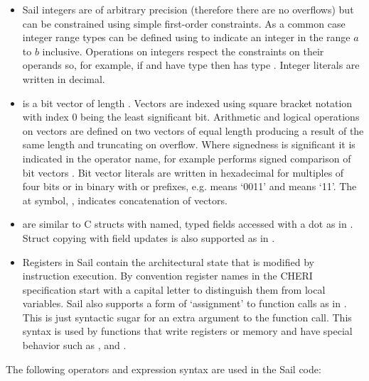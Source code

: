 \label{sailMIPSzbits}
\label{sailRISCVzbits}
\begin{itemize}
\item {} Sail integers are of arbitrary precision (therefore there are no overflows) but can be constrained using simple first-order constraints. As a common case integer range types can be defined using  to indicate an integer in the range $a$ to $b$ inclusive. Operations on integers respect the constraints on their operands so, for example, if  and  have type  then  has type . Integer literals are written in decimal.
\item {} \label{zbits} is a bit vector of length . Vectors are indexed using square bracket notation with index 0 being the least significant bit. Arithmetic and logical operations on vectors are defined on two vectors of equal length producing a result of the same length and truncating on overflow. Where signedness is significant it is indicated in the operator name, for example  performs signed comparison of bit vectors . Bit vector literals are written in hexadecimal for multiples of four bits or in binary with  or  prefixes, e.g.  means `0011' and  means `11'. The at symbol, , indicates concatenation of vectors.
\item {} are similar to C structs with named, typed fields accessed with a dot as in . Struct copying with field updates is also supported as in .
\item Registers in Sail contain the architectural state that is modified by instruction execution. By convention register names in the CHERI specification start with a capital letter to distinguish them from local variables. Sail also supports a form of `assignment' to function calls as in . This is just syntactic sugar for an extra argument to the function call. This syntax is used by functions that write registers or memory and have special behavior such as ,  and .
\end{itemize}

The following operators and expression syntax are used in the Sail code:

